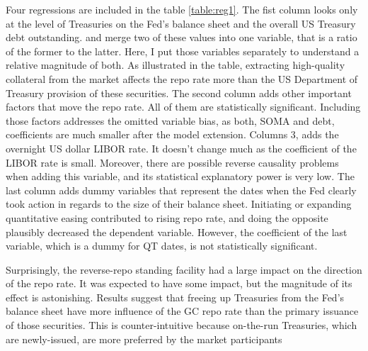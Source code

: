 \documentclass[11pt,a4paper,english,oneside]{article}
\begin{document}
Four regressions are included in the table \ref{table:reg1}. The fist column looks only at the level of Treasuries on the Fed's balance sheet and the overall US Treasury debt outstanding. \citet{damico2014} and \citet{arrata2018} merge two of these values into one variable, that is a ratio of the former to the latter. Here, I put those variables separately to understand a relative magnitude of both. As illustrated in the table, extracting high-quality collateral from the market affects the repo rate more than the US Department of Treasury provision of these securities. The second column adds other important factors that move the repo rate. All of them are statistically significant. Including those factors addresses the omitted variable bias, as both, SOMA and debt, coefficients are much smaller after the model extension. Columns 3, adds the overnight US dollar LIBOR rate. It doesn't change much as the coefficient of the LIBOR rate is small. Moreover, there are possible reverse causality problems when adding this variable, and its statistical explanatory power is very low. The last column adds dummy variables that represent the dates when the Fed clearly took action in regards to the size of their balance sheet. Initiating or expanding quantitative easing contributed to rising repo rate, and doing the opposite plausibly decreased the dependent variable. However, the coefficient of the last variable, which is a dummy for QT dates, is not statistically significant.

Surprisingly, the reverse-repo standing facility had a large impact on the direction of the repo rate. It was expected to have some impact, but the magnitude of its effect is astonishing. Results suggest that freeing up Treasuries from the Fed's balance sheet have more influence of the GC repo rate than the primary issuance of those securities. This is counter-intuitive because on-the-run Treasuries, which are newly-issued, are more preferred by the market participants 


\end{document}
